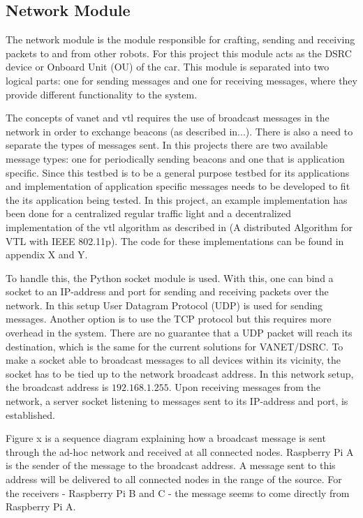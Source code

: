 \subsection{Network Module}
The network module is the module responsible for crafting, sending and receiving packets to and from other robots. For this project this module acts as the DSRC device or Onboard Unit (OU) of the car. This module is separated into two logical parts: one for sending messages and one for receiving messages, where they provide different functionality to the system. 

The concepts of \gls{vanet} and \gls{vtl} requires the use of broadcast messages in the network in order to exchange beacons (as described in...). There is also a need to separate the types of messages sent. In this projects there are two available message types: one for periodically sending beacons and one that is application specific. Since this testbed is to be a general purpose testbed for \gls{its} applications and implementation of application specific messages needs to be developed to fit the \gls{its} application being tested. In this project, an example implementation has been done for a centralized regular traffic light and a decentralized implementation of the \gls{vtl} algorithm as described in (A distributed Algorithm for VTL with IEEE 802.11p). The code for these implementations can be found in appendix X and Y. 

To handle this, the Python socket module is used. With this, one can bind a socket to an IP-address and port for sending and receiving packets over the network. In this setup User Datagram Protocol (UDP) is used for sending messages. Another option is to use the TCP protocol but this requires more overhead in the system. There are no guarantee that a UDP packet will reach its destination, which is the same for the current solutions for VANET/DSRC. To make a socket able to broadcast messages to all devices within its vicinity, the socket has to be tied up to the network broadcast address. In this network setup, the broadcast address is $192.168.1.255$. Upon receiving messages from the network, a server socket listening to messages sent to its IP-address and port, is established.

Figure x is a sequence diagram explaining how a broadcast message is sent through the ad-hoc network and received at all connected nodes. Raspberry Pi A is the sender of the message to the broadcast address. A message sent to this address will be delivered to all connected nodes in the range of the source. For the receivers - Raspberry Pi B and C - the message seems to come directly from Raspberry Pi A. 

